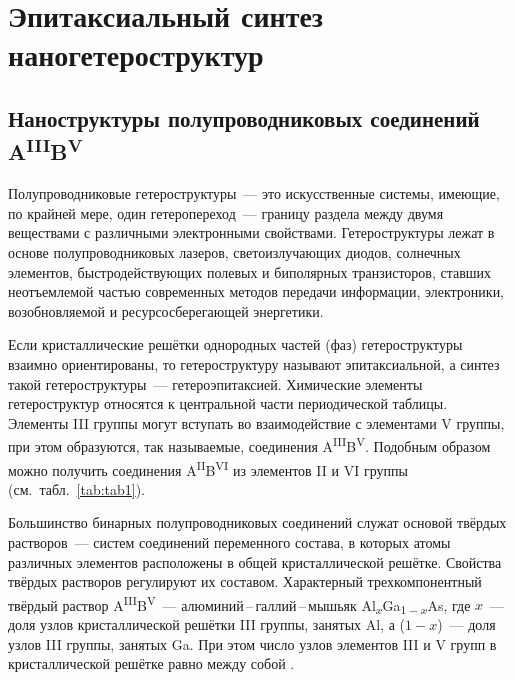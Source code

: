 \chapter{Эпитаксиальный синтез наногетероструктур}\label{ch:ch1}

\section{Наноструктуры полупроводниковых соединений
A\textsuperscript{III}B\textsuperscript{V}}\label{sec:ch1/sec1}

Полупроводниковые гетероструктуры~--- это искусственные системы, имеющие, по
крайней мере, один гетеропереход~--- границу раздела между двумя веществами с
различными электронными свойствами. Гетероструктуры лежат в основе
полупроводниковых лазеров, светоизлучающих диодов, солнечных элементов,
быстродействующих полевых и биполярных транзисторов, ставших неотъемлемой
частью современных методов передачи информации, электроники, возобновляемой и
ресурсосберегающей энергетики.

Если кристаллические решётки однородных частей (фаз) гетероструктуры взаимно
ориентированы, то гетероструктуру называют эпитаксиальной, а синтез такой
гетероструктуры~--- гетероэпитаксией. Химические элементы гетероструктур
относятся к центральной части периодической таблицы. Элементы III группы могут
вступать во взаимодействие с элементами V группы, при этом образуются, так
называемые, соединения A\textsuperscript{III}B\textsuperscript{V}. Подобным
образом можно получить соединения A\textsuperscript{II}B\textsuperscript{VI} из
элементов II и VI группы (см.~табл.~\cref{tab:tab1}).

Большинство бинарных полупроводниковых соединений служат основой твёрдых
растворов~--- систем соединений переменного состава, в которых атомы различных
элементов расположены в общей кристаллической решётке. Свойства твёрдых
растворов регулируют их составом. Характерный трехкомпонентный твёрдый раствор
A\textsuperscript{III}B\textsuperscript{V}~--- алюминий\,--\,галлий\,--\,мышьяк
Al\textsubscript{\(x\)}Ga\textsubscript{\(1 - x\)}As, где \(x\)~--- доля узлов
кристаллической решётки III группы, занятых Al, а (\(1 - x\))~--- доля узлов
III группы, занятых Ga. При этом число узлов элементов III и V групп в
кристаллической решётке равно между собой \cite{Kroemer2001}.

